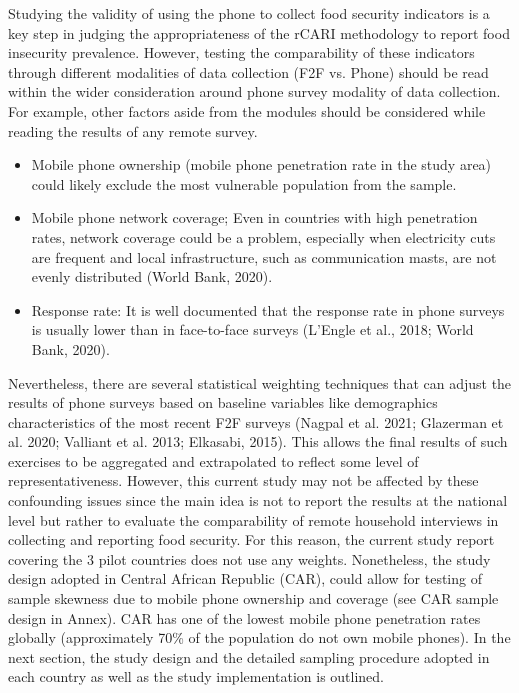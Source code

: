 \documentclass[11pt,harvard]{article}
\begin{document}
Studying the validity of using the phone to collect food security indicators is a key step in judging the appropriateness of the rCARI methodology to report food insecurity prevalence. However, testing the comparability of these indicators through different modalities of data collection (F2F vs. Phone) should be read within the wider consideration around phone survey modality of data collection. For example, other factors aside from the modules should be considered while reading the results of any remote survey.
	
	\begin{itemize}[label=--, left=1.5em]
		\item[1.]	Mobile phone ownership (mobile phone penetration rate in the study area) could likely exclude the most vulnerable population from the sample. 
		\item[2.]	Mobile phone network coverage; Even in countries with high penetration rates, network coverage could be a problem, especially when electricity cuts are frequent and local infrastructure, such as communication masts, are not evenly distributed (World Bank, 2020).
		\item[3.]	Response rate: It is well documented that the response rate in phone surveys is usually lower than in face-to-face surveys (L’Engle et al., 2018; World Bank, 2020). 
	\end{itemize}
	
Nevertheless, there are several statistical weighting techniques that can adjust the results of phone surveys based on baseline variables like demographics characteristics of the most recent F2F surveys (Nagpal et al. 2021; Glazerman et al. 2020; Valliant et al. 2013; Elkasabi, 2015). This allows the final results of such exercises to be aggregated and extrapolated to reflect some level of representativeness. However, this current study may not be affected by these confounding issues since the main idea is not to report the results at the national level but rather to evaluate the comparability of remote household interviews in collecting and reporting food security. For this reason, the current study report covering the 3 pilot countries does not use any weights. Nonetheless, the study design adopted in Central African Republic (CAR), could allow for testing of sample skewness due to mobile phone ownership and coverage (see CAR sample design in Annex). CAR has one of the lowest mobile phone penetration rates globally (approximately 70\% of the population do not own mobile phones). In the next section, the study design and the detailed sampling procedure adopted in each country as well as the study implementation is outlined.
	
\end{document}
